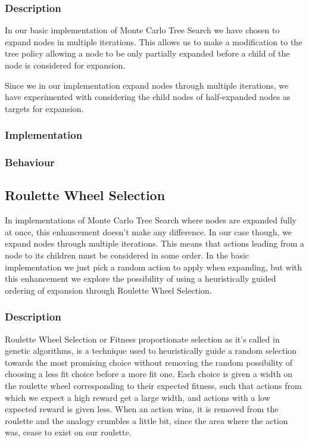\documentclass[10pt,a4paper]{article}
\begin{document}
\subsubsection{Description}
In our basic implementation of Monte Carlo Tree Search we have chosen to expand nodes in multiple iterations. This allows us to make a modification to the tree policy allowing a node to be only partially expanded before a child of the node is considered for expansion.


Since we in our implementation expand nodes through multiple iterations, we have experimented with considering the child nodes of half-expanded nodes as targets for expansion.


\subsubsection{Implementation}
\subsubsection{Behaviour}
\subsection{Roulette Wheel Selection}
In implementations of Monte Carlo Tree Search where nodes are expanded fully at once, this enhancement doesn't make any difference. In our case though, we expand nodes through multiple iterations. This means that actions leading from a node to its children must be considered in some order. In the basic implementation we just pick a random action to apply when expanding, but with this enhancement we explore the possibility of using a heuristically guided ordering of expansion through Roulette Wheel Selection.

\subsubsection{Description}
Roulette Wheel Selection or Fitness proportionate selection as it's called in genetic algorithms, is a technique used to heuristically guide a random selection towards the most promising choice without removing the random possibility of choosing a less fit choice before a more fit one. Each choice is given a width on the roulette wheel corresponding to their expected fitness, such that actions from which we expect a high reward get a large width, and actions with a low expected reward is given less.
When an action wins, it is removed from the roulette and the analogy crumbles a little bit, since the area where the action was, cease to exist on our roulette.
\end{document}

